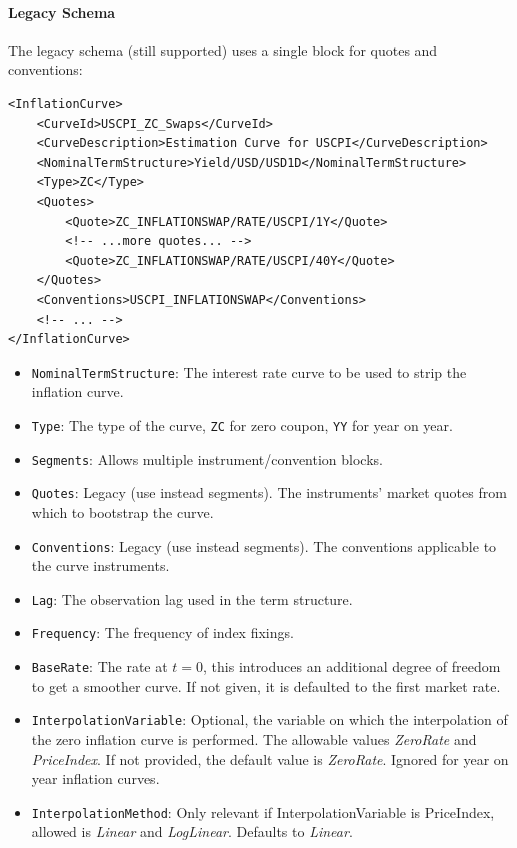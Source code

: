 \paragraph{Legacy Schema}
The legacy schema (still supported) uses a single block for quotes and conventions:
\begin{verbatim}
<InflationCurve>
    <CurveId>USCPI_ZC_Swaps</CurveId>
    <CurveDescription>Estimation Curve for USCPI</CurveDescription>
    <NominalTermStructure>Yield/USD/USD1D</NominalTermStructure>
    <Type>ZC</Type>
    <Quotes>
        <Quote>ZC_INFLATIONSWAP/RATE/USCPI/1Y</Quote>
        <!-- ...more quotes... -->
        <Quote>ZC_INFLATIONSWAP/RATE/USCPI/40Y</Quote>
    </Quotes>
    <Conventions>USCPI_INFLATIONSWAP</Conventions>
    <!-- ... -->
</InflationCurve>
\end{verbatim}

\begin{itemize}
\item {\tt NominalTermStructure}: The interest rate curve to be used to strip the inflation curve.
\item {\tt Type}: The type of the curve, {\tt ZC} for zero coupon, {\tt YY} for year on year.
\item {\tt Segments}: Allows multiple instrument/convention blocks.
\item {\tt Quotes}: Legacy (use instead segments). The instruments' market quotes from which to bootstrap the curve.
\item {\tt Conventions}: Legacy (use instead segments). The conventions applicable to the curve instruments.
\item {\tt Lag}: The observation lag used in the term structure.
\item {\tt Frequency}: The frequency of index fixings.
\item {\tt BaseRate}: The rate at $t=0$, this introduces an additional degree of freedom to get a smoother curve. If not
  given, it is defaulted to the first market rate.
\item {\tt InterpolationVariable}: Optional, the variable on which the interpolation of the zero inflation curve is
  performed. The allowable values \emph{ZeroRate} and \emph{PriceIndex}. If not provided, the default value is \emph{ZeroRate}. Ignored for year on year inflation curves.
\item {\tt InterpolationMethod}: Only relevant if InterpolationVariable is PriceIndex, allowed is \emph{Linear} and \emph{LogLinear}. Defaults to \emph{Linear}.
\end{itemize}

